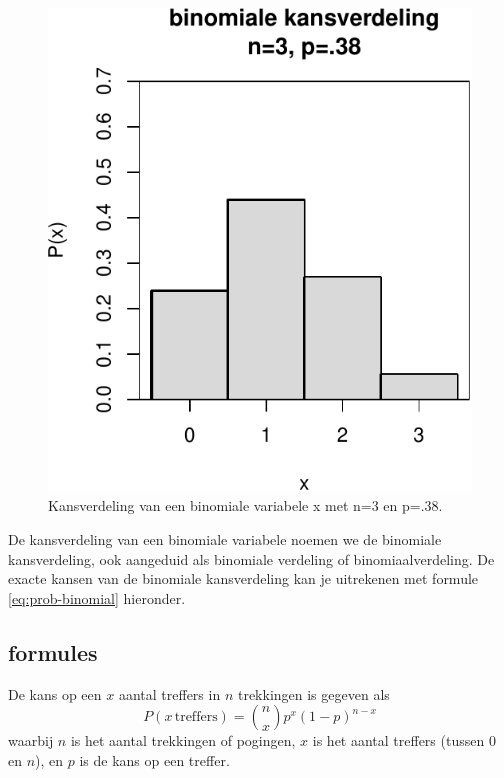 \documentclass[
]{book}
\begin{document}
\begin{figure}
\centering
\includegraphics{MS1NL-boek_files/figure-latex/binomkansverdeling3-1.pdf}
\caption{\label{fig:binomkansverdeling3}Kansverdeling van een binomiale variabele x met n=3 en p=.38.}
\end{figure}

De kansverdeling van een binomiale variabele noemen we de binomiale
kansverdeling, ook aangeduid als binomiale verdeling of
binomiaalverdeling. De exacte kansen van de binomiale kansverdeling kan
je uitrekenen met formule \eqref{eq:prob-binomial} hieronder.

\hypertarget{formules}{%
\subsection{formules}\label{formules}}

De kans op een \(x\) aantal treffers in \(n\) trekkingen is gegeven als
\begin{equation}
  P(x\,\mbox{treffers}) = {n \choose x} p^x (1-p)^{n-x}
  \label{eq:prob-binomial}
\end{equation}
waarbij \(n\) is het aantal trekkingen of pogingen, \(x\) is het aantal treffers (tussen
0 en \(n\)), en \(p\) is de kans op een treffer.
\end{document}
